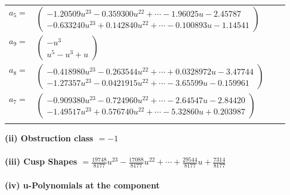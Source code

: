 \documentclass[1p]{elsarticle_modified}
\theoremstyle{definition}
\begin{document}
\begin{tabular}{m{7pt} m{180pt} m{7pt} m{180pt} }
\flushright $a_{5}=$&$\begin{pmatrix}-1.20509 u^{23}-0.359300 u^{22}+\cdots-1.96025 u-2.45787\\-0.633240 u^{23}+0.142840 u^{22}+\cdots-0.100893 u-1.14541\end{pmatrix}$ \\
\flushright $a_{9}=$&$\begin{pmatrix}- u^3\\u^5- u^3+u\end{pmatrix}$ \\
\flushright $a_{8}=$&$\begin{pmatrix}-0.418980 u^{23}-0.263544 u^{22}+\cdots+0.0328972 u-3.47744\\-1.27357 u^{23}-0.0421915 u^{22}+\cdots-3.65599 u-0.159961\end{pmatrix}$ \\
\flushright $a_{7}=$&$\begin{pmatrix}-0.909380 u^{23}-0.724960 u^{22}+\cdots-2.64547 u-2.84420\\-1.49517 u^{23}+0.576740 u^{22}+\cdots-5.32860 u+0.203987\end{pmatrix}$\\&\end{tabular}
\flushleft \textbf{(ii) Obstruction class $= -1$}\\~\\
\flushleft \textbf{(iii) Cusp Shapes $= \frac{19748}{8177} u^{23}-\frac{17088}{8177} u^{22}+\cdots+\frac{29544}{8177} u+\frac{7314}{8177}$}\\~\\
\newpage\renewcommand{\arraystretch}{1}
\flushleft \textbf{(iv) u-Polynomials at the component}\newline \\
\end{document}
